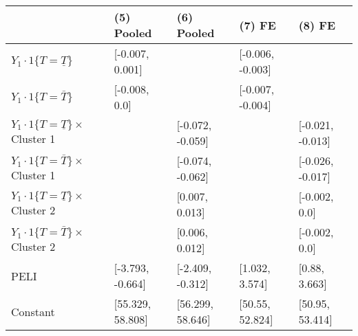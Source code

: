 \begin{tabular}{lllll}
\hline
 & (5) Pooled & (6) Pooled & (7) FE & (8) FE \\
\hline
$Y_1\cdot\text{1}\{T=\underline{T}\}$ & [-0.007, 0.001] &  & [-0.006, -0.003] &  \\
$Y_1\cdot\text{1}\{T=\bar{T}\}$ & [-0.008, 0.0] &  & [-0.007, -0.004] &  \\
$Y_1\cdot\text{1}\{T=\underline{T}\}\times$ Cluster 1 &  & [-0.072, -0.059] &  & [-0.021, -0.013] \\
$Y_1\cdot\text{1}\{T=\bar{T}\}\times$ Cluster 1 &  & [-0.074, -0.062] &  & [-0.026, -0.017] \\
$Y_1\cdot\text{1}\{T=\underline{T}\}\times$ Cluster 2 &  & [0.007, 0.013] &  & [-0.002, 0.0] \\
$Y_1\cdot\text{1}\{T=\bar{T}\}\times$ Cluster 2 &  & [0.006, 0.012] &  & [-0.002, 0.0] \\
PELI & [-3.793, -0.664] & [-2.409, -0.312] & [1.032, 3.574] & [0.88, 3.663] \\
Constant & [55.329, 58.808] & [56.299, 58.646] & [50.55, 52.824] & [50.95, 53.414] \\
\hline
\end{tabular}\hline

